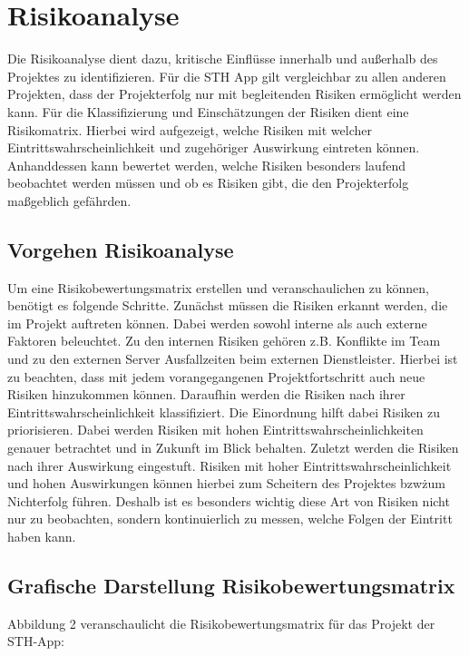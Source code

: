 \chapter{Risikoanalyse}

Die Risikoanalyse dient dazu, kritische Einflüsse innerhalb und außerhalb des Projektes zu identifizieren.
Für die STH App gilt vergleichbar zu allen anderen Projekten, dass der Projekterfolg nur mit begleitenden Risiken ermöglicht werden kann.
Für die Klassifizierung und Einschätzungen der Risiken dient eine Risikomatrix. Hierbei wird aufgezeigt, welche Risiken mit welcher Eintrittswahrscheinlichkeit und zugehöriger Auswirkung eintreten können.
Anhanddessen kann bewertet werden, welche Risiken besonders laufend beobachtet werden müssen und ob es Risiken gibt, die den Projekterfolg maßgeblich gefährden.

\section{Vorgehen Risikoanalyse}
Um eine Risikobewertungsmatrix erstellen und veranschaulichen zu können, benötigt es folgende Schritte.
Zunächst müssen die Risiken erkannt werden, die im Projekt auftreten können.
Dabei werden sowohl interne als auch externe Faktoren beleuchtet.
Zu den internen Risiken gehören z.B. Konflikte im Team und zu den externen Server Ausfallzeiten beim externen Dienstleister.
Hierbei ist zu beachten, dass mit jedem vorangegangenen Projektfortschritt auch neue Risiken hinzukommen können.
Daraufhin werden die Risiken nach ihrer Eintrittswahrscheinlichkeit klassifiziert.
Die Einordnung hilft dabei Risiken zu priorisieren.
Dabei werden Risiken mit hohen Eintrittswahrscheinlichkeiten genauer betrachtet und in Zukunft im Blick behalten.
Zuletzt werden die Risiken nach ihrer Auswirkung eingestuft.
Risiken mit hoher Eintrittswahrscheinlichkeit und hohen Auswirkungen können hierbei zum Scheitern des Projektes bzw\. zum Nichterfolg führen.
Deshalb ist es besonders wichtig diese Art von Risiken nicht nur zu beobachten, sondern kontinuierlich zu messen, welche Folgen der Eintritt haben kann.

\newpage
\section{Grafische Darstellung Risikobewertungsmatrix}
Abbildung 2 veranschaulicht die Risikobewertungsmatrix für das Projekt der STH-App:

